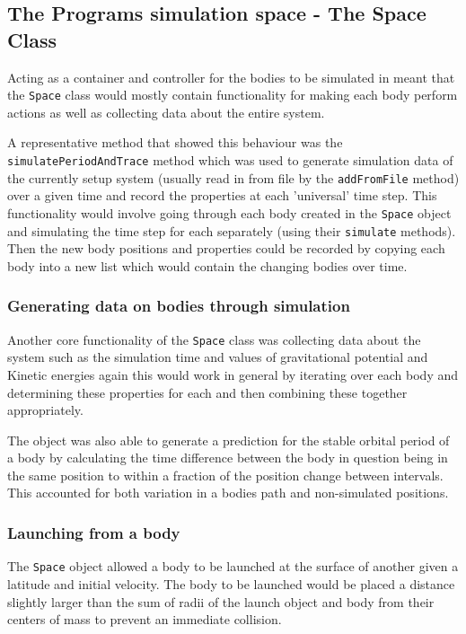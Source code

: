 \documentclass{article}
\begin{document}
        \subsection{The Programs simulation space - The Space Class}
                Acting as a container and controller for the bodies to be simulated in meant that 
                the \verb|Space| class would mostly contain functionality for making each body
                perform actions as well as collecting data about the entire system.
                \par 
                A representative method that showed this behaviour was the 
                \verb|simulatePeriodAndTrace| method which was used to generate simulation data of 
                the currently setup system (usually read in from file by the \verb|addFromFile| 
                method) over a given time and record the properties at each 'universal' time step. 
                This functionality would involve going through each body created in the \verb|Space| 
                object and simulating the time step for each separately (using their \verb|simulate|
                methods). Then the new body positions and properties could be recorded by 
                copying each body into a new list which would contain the changing bodies over time.

                \subsubsection{Generating data on bodies through simulation}
                Another core functionality of the \verb|Space| class was collecting data about the 
                system such as the  simulation time and values of gravitational potential and 
                Kinetic energies again this would work in general by iterating over each body and
                determining these properties for each and then combining these together
                 appropriately.

                \par
                The object was also able to generate a prediction for the stable orbital period of a
                body by calculating the time difference between the body in question being in the
                same position to within a fraction of the position change between intervals. 
                This accounted for both variation in a bodies path and non-simulated positions.

                \subsubsection{Launching from a body}
                    The \verb|Space| object allowed a body to be launched at the surface of another 
                    given a latitude and initial velocity. The body to be launched would be placed a 
                    distance slightly larger than the sum of radii of the launch object and body 
                    from their centers of mass to prevent an immediate collision.
                
\end{document}
